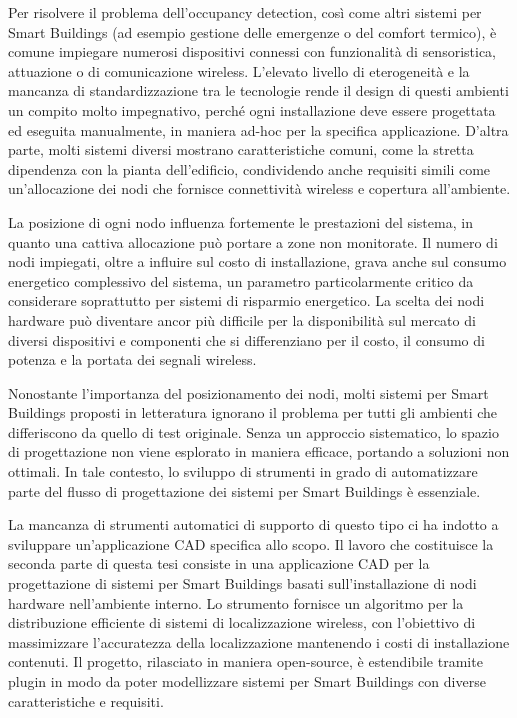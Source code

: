 \medskip
Per risolvere il problema dell'occupancy detection, così come altri sistemi per Smart Buildings (ad esempio gestione delle emergenze o del comfort termico), è comune impiegare numerosi dispositivi connessi con funzionalità di sensoristica, attuazione o di comunicazione wireless. 
L'elevato livello di eterogeneità e la mancanza di standardizzazione tra le tecnologie rende il design di questi ambienti un compito molto impegnativo, perché ogni installazione deve essere progettata ed eseguita manualmente, in maniera ad-hoc per la specifica applicazione. D'altra parte, molti sistemi diversi mostrano caratteristiche comuni, come la stretta dipendenza con la pianta dell'edificio, condividendo anche requisiti simili come un'allocazione dei nodi che fornisce connettività wireless e copertura all'ambiente.

La posizione di ogni nodo influenza fortemente le prestazioni del sistema, in quanto una cattiva allocazione può portare a zone non monitorate. Il numero di nodi impiegati, oltre a influire sul costo di installazione, grava anche sul consumo energetico complessivo del sistema, un parametro particolarmente critico da considerare soprattutto per sistemi di risparmio energetico.
La scelta dei nodi hardware può diventare ancor più difficile per la disponibilità sul mercato di diversi dispositivi e componenti che si differenziano per il costo, il consumo di potenza e la portata dei segnali wireless.

Nonostante l'importanza del posizionamento dei nodi, molti sistemi per Smart Buildings proposti in letteratura ignorano il problema per tutti gli ambienti che differiscono da quello di test originale.
Senza un approccio sistematico, lo spazio di progettazione non viene esplorato in maniera efficace, portando a soluzioni non ottimali. In tale contesto, lo sviluppo di strumenti in grado di automatizzare parte del flusso di progettazione dei sistemi per Smart Buildings è essenziale.

La mancanza di strumenti automatici di supporto di questo tipo ci ha indotto a sviluppare un'applicazione CAD specifica allo scopo.
Il lavoro che costituisce la seconda parte di questa tesi consiste in una applicazione CAD per la progettazione di sistemi per Smart Buildings basati sull'installazione di nodi hardware nell'ambiente interno. Lo strumento fornisce un algoritmo per la distribuzione efficiente di sistemi di localizzazione wireless, con l'obiettivo di massimizzare l'accuratezza della localizzazione mantenendo i costi di installazione contenuti.
Il progetto, rilasciato in maniera open-source, è estendibile tramite plugin in modo da poter modellizzare sistemi per Smart Buildings con diverse caratteristiche e requisiti.



